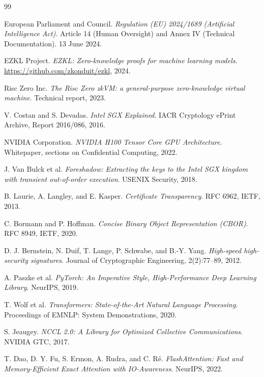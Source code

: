 \documentclass[10pt]{article}
\begin{document}
\begin{thebibliography}{99}
\small

 European Parliament and Council. \emph{Regulation (EU) 2024/1689 (Artificial Intelligence Act)}. Article 14 (Human Oversight) and Annex IV (Technical Documentation). 13 June 2024.

 EZKL Project. \emph{EZKL: Zero-knowledge proofs for machine learning models}. \url{https://github.com/zkonduit/ezkl}, 2024.

 Risc Zero Inc. \emph{The Risc Zero zkVM: a general-purpose zero-knowledge virtual machine}. Technical report, 2023.

 V. Costan and S. Devadas. \emph{Intel SGX Explained}. IACR Cryptology ePrint Archive, Report 2016/086, 2016.

 NVIDIA Corporation. \emph{NVIDIA H100 Tensor Core GPU Architecture}. Whitepaper, sections on Confidential Computing, 2022.

 J. Van Bulck et al. \emph{Foreshadow: Extracting the keys to the Intel SGX kingdom with transient out-of-order execution}. USENIX Security, 2018.

 B. Laurie, A. Langley, and E. Kasper. \emph{Certificate Transparency}. RFC 6962, IETF, 2013.

 C. Bormann and P. Hoffman. \emph{Concise Binary Object Representation (CBOR)}. RFC 8949, IETF, 2020.

 D. J. Bernstein, N. Duif, T. Lange, P. Schwabe, and B.-Y. Yang. \emph{High-speed high-security signatures}. Journal of Cryptographic Engineering, 2(2):77--89, 2012.

 A. Paszke et al. \emph{PyTorch: An Imperative Style, High-Performance Deep Learning Library}. NeurIPS, 2019.

 T. Wolf et al. \emph{Transformers: State-of-the-Art Natural Language Processing}. Proceedings of EMNLP: System Demonstrations, 2020.

 S. Jeaugey. \emph{NCCL 2.0: A Library for Optimized Collective Communications}. NVIDIA GTC, 2017.

 T. Dao, D. Y. Fu, S. Ermon, A. Rudra, and C. R\'e. \emph{FlashAttention: Fast and Memory-Efficient Exact Attention with IO-Awareness}. NeurIPS, 2022.


\end{thebibliography}
\end{document}
